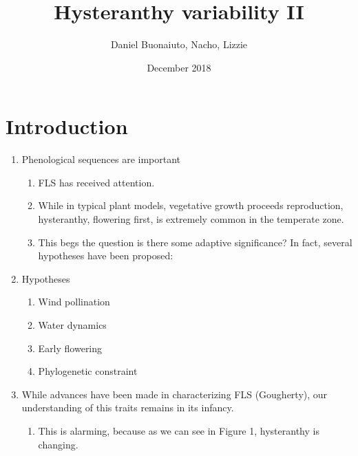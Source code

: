 \documentclass{article}
\title{Hysteranthy variability II}
\author{Daniel Buonaiuto, Nacho, Lizzie}
\date{December 2018}
\begin{document}
\maketitle

\section{Introduction}

\begin{enumerate}
    \item Phenological sequences are important %
    \begin{enumerate}
        \item FLS has received attention.
        \item While in typical plant models, vegetative growth proceeds reproduction, hysteranthy, flowering first, is extremely common in the temperate zone.
        \item This begs the question is there some adaptive significance? In fact, several hypotheses have been proposed:
    \end{enumerate}
    \item Hypotheses
    \begin{enumerate}
        \item Wind pollination
        \item Water dynamics
        \item Early flowering
        \item Phylogenetic constraint
    \end{enumerate}
    \item While advances have been made in characterizing FLS (Gougherty), our understanding of this traits remains in its infancy. 
    \begin{enumerate}
        \item This is alarming, because as we can see in Figure 1, hysteranthy is changing.


\end{enumerate}
\end{enumerate}
\end{document}
